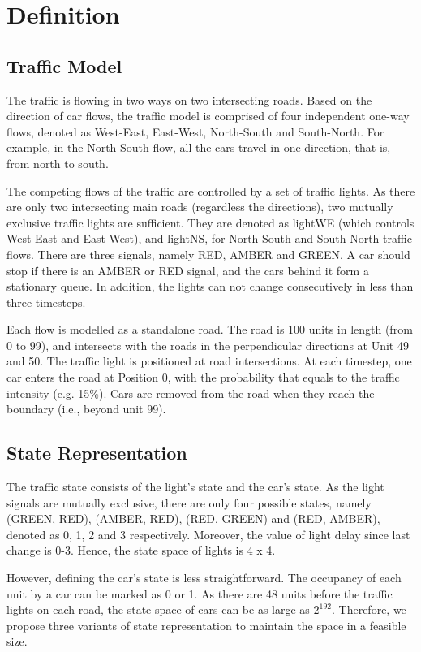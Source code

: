 \section{Definition}

\subsection{Traffic Model}
The traffic is flowing in two ways on two intersecting roads. Based on the
direction of car flows, the traffic model is comprised of four independent
one-way flows, denoted as West-East, East-West, North-South and South-North. For
example, in the North-South flow, all the cars travel in one direction, that is,
from north to south.

The competing flows of the traffic are controlled by a set of traffic lights. As
there are only two intersecting main roads (regardless the directions), two
mutually exclusive traffic lights are sufficient. They are denoted as lightWE
(which controls West-East and East-West), and lightNS, for North-South and
South-North traffic flows. There are three signals, namely RED, AMBER and GREEN.
A car should stop if there is an AMBER or RED signal, and the cars behind
it form a stationary queue. In addition, the lights can not change consecutively in
less than three timesteps.

Each flow is modelled as a standalone road. The road is 100 units in length
(from 0 to 99), and intersects with the roads in the perpendicular directions at
Unit 49 and 50. The traffic light is positioned at road intersections. At each
timestep, one car enters the road at Position 0, with the probability that
equals to the traffic intensity (e.g. 15\%). Cars are removed from the road when
they reach the boundary (i.e., beyond unit 99).

\subsection{State Representation}
The traffic state consists of the light's state and the car's state. As the
light signals are mutually exclusive, there are only four possible states,
namely (GREEN, RED), (AMBER, RED), (RED, GREEN) and (RED, AMBER), denoted as 0,
1, 2 and 3 respectively. Moreover, the value of light delay since last change is
0-3. Hence, the state space of lights is 4 x 4.

However, defining the car's state is less straightforward. The occupancy of each
unit by a car can be marked as 0 or 1. As there are 48 units before the traffic
lights on each road, the state space of cars can be as large as $2^{192}$.
Therefore, we propose three variants of state representation to maintain the
space in a feasible size.

